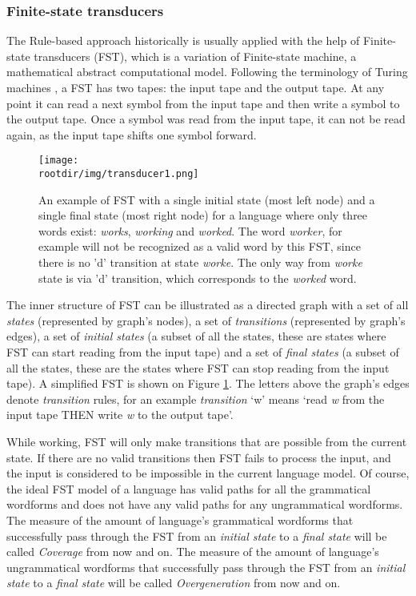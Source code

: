 \subsubsection{Finite-state transducers}
The Rule-based approach historically is usually applied with the help of Finite-state transducers (FST), which is a variation of Finite-state machine, a mathematical abstract computational model. Following the terminology of Turing machines \parencite{Turing_1937}, a FST has two tapes: the input tape and the output tape. At any point it can read a next symbol from the input tape and then write a symbol to the output tape. Once a symbol was read from the input tape, it can not be read again, as the input tape shifts one symbol forward. 

\begin{figure}[!h]
    \centering
    \texttt{[image: \\rootdir/img/transducer1.png]}
    \caption{An example of FST with a single initial state (most left node) and a single final state (most right node) for a language where only three words exist: \textit{works}, \textit{working} and \textit{worked}. The word \textit{worker}, for example will not be recognized as a valid word by this FST, since there is no 'd' transition at state \textit{worke}. The only way from \textit{worke} state is via 'd' transition, which corresponds to the \textit{worked} word. \parencite{beesley_fst_2002}}
    \label{fig:fst1}
\end{figure}

The inner structure of FST can be illustrated as a directed graph with a set of all \textit{states} (represented by graph's nodes), a set of \textit{transitions} (represented by graph's edges), a set of \textit{initial states} (a subset of all the states, these are states where FST can start reading from the input tape) and a set of \textit{final states} (a subset of all the states, these are the states where FST can stop reading from the input tape). A simplified FST is shown on Figure \ref{fig:fst1}. The letters above the graph's edges denote \textit{transition} rules, for an example \textit{transition} `w' means `read \textit{w} from the input tape THEN write \textit{w} to the output tape'.

While working, FST will only make transitions that are possible from the current state. If there are no valid transitions then FST fails to process the input, and the input is considered to be impossible in the current language model. Of course, the ideal FST model of a language has valid paths for all the grammatical wordforms and does not have any valid paths for any ungrammatical wordforms. The measure of the amount of language's grammatical wordforms that successfully pass through the FST from an \textit{initial state} to a \textit{final state} will be called \textit{Coverage} from now and on. The measure of the amount of language's ungrammatical wordforms that successfully pass through the FST from an \textit{initial state} to a \textit{final state} will be called \textit{Overgeneration} from now and on.

